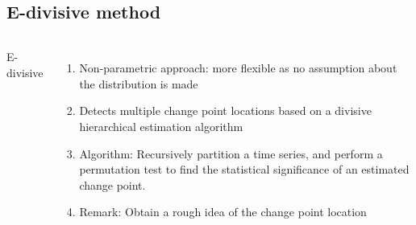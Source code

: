 \documentclass{beamer}
\begin{document}
\subsection{E-divisive method}
\begin{frame}[fragile]

\begin{columns}[c] %

E-divisive \cite{p3}
\begin{enumerate}
\item Non-parametric approach: more flexible as no assumption about the distribution is made
\item Detects multiple change point locations based on a divisive hierarchical estimation algorithm
\item Algorithm: Recursively partition a time series, and perform a permutation test to find the statistical significance of an estimated change point.
\item Remark: Obtain a rough idea of the change point location 
\end{enumerate}


\end{columns}
\end{frame}
\end{document}
